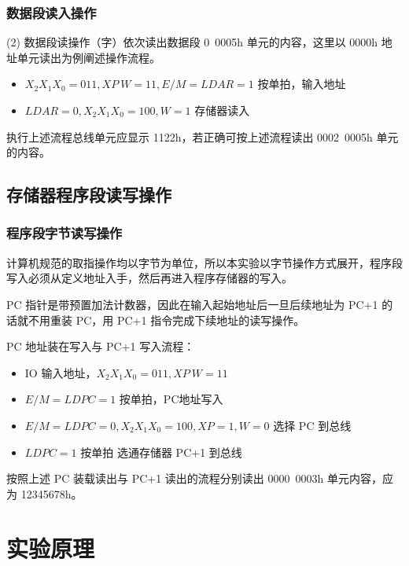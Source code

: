 \documentclass[a4paper,10pt,UTF8]{paper}
\numberwithin{equation}{section}
\numberwithin{figure}{section}
\begin{document}
\subsubsection{数据段读入操作}

(2)	数据段读操作（字）依次读出数据段 0~0005h 单元的内容，这里以 0000h 地址单元读出为例阐述操作流程。

\begin{itemize}
    \item $X_2X_1X_0=011, XP\ W=11,E/M=LDAR=1$ 按单拍，输入地址
    \item $LDAR=0, X_2X_1X_0=100, W=1$ 存储器读入
\end{itemize}

执行上述流程总线单元应显示 1122h，若正确可按上述流程读出 0002~0005h 单元的内容。

\subsection{存储器程序段读写操作}

\subsubsection{程序段字节读写操作}

计算机规范的取指操作均以字节为单位，所以本实验以字节操作方式展开，程序段写入必须从定义地址入手，然后再进入程序存储器的写入。

PC 指针是带预置加法计数器，因此在输入起始地址后一旦后续地址为 PC+1 的话就不用重装 PC，用 PC+1 指令完成下续地址的读写操作。

PC 地址装在写入与 PC+1 写入流程：

\begin{itemize}
    \item IO 输入地址，$X_2X_1X_0=011,XP\ W = 11$
    \item $E/M=LDPC=1$ 按单拍，PC地址写入
    \item $E/M=LDPC=0,X_2X_1X_0=100,XP=1,W=0$ 选择 PC 到总线
    \item $LDPC=1$ 按单拍 选通存储器 PC+1 到总线
\end{itemize}

按照上述 PC 装载读出与 PC+1 读出的流程分别读出 0000~0003h 单元内容，应为 12345678h。



\section{实验原理}
\end{document}
